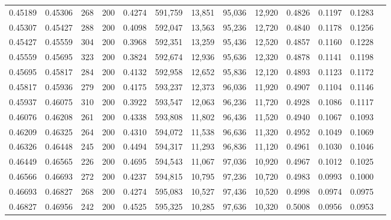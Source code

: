 \begin{tabular}{rrrrrrrrrrrrr}
0.45189 & 0.45306 &   268 & 200 &                                     0.4274 & 591,759 &  13,851 &  95,036 &  12,920 & 0.4826 & 0.1197 & 0.1283 \\
0.45307 & 0.45427 &   288 & 200 &                                     0.4098 & 592,047 &  13,563 &  95,236 &  12,720 & 0.4840 & 0.1178 & 0.1256 \\
0.45427 & 0.45559 &   304 & 200 &                                     0.3968 & 592,351 &  13,259 &  95,436 &  12,520 & 0.4857 & 0.1160 & 0.1228 \\
0.45559 & 0.45695 &   323 & 200 &                                     0.3824 & 592,674 &  12,936 &  95,636 &  12,320 & 0.4878 & 0.1141 & 0.1198 \\
0.45695 & 0.45817 &   284 & 200 &                                     0.4132 & 592,958 &  12,652 &  95,836 &  12,120 & 0.4893 & 0.1123 & 0.1172 \\
0.45817 & 0.45936 &   279 & 200 &                                     0.4175 & 593,237 &  12,373 &  96,036 &  11,920 & 0.4907 & 0.1104 & 0.1146 \\
0.45937 & 0.46075 &   310 & 200 &                                     0.3922 & 593,547 &  12,063 &  96,236 &  11,720 & 0.4928 & 0.1086 & 0.1117 \\
0.46076 & 0.46208 &   261 & 200 &                                     0.4338 & 593,808 &  11,802 &  96,436 &  11,520 & 0.4940 & 0.1067 & 0.1093 \\
0.46209 & 0.46325 &   264 & 200 &                                     0.4310 & 594,072 &  11,538 &  96,636 &  11,320 & 0.4952 & 0.1049 & 0.1069 \\
0.46326 & 0.46448 &   245 & 200 &                                     0.4494 & 594,317 &  11,293 &  96,836 &  11,120 & 0.4961 & 0.1030 & 0.1046 \\
0.46449 & 0.46565 &   226 & 200 &                                     0.4695 & 594,543 &  11,067 &  97,036 &  10,920 & 0.4967 & 0.1012 & 0.1025 \\
0.46566 & 0.46693 &   272 & 200 &                                     0.4237 & 594,815 &  10,795 &  97,236 &  10,720 & 0.4983 & 0.0993 & 0.1000 \\
0.46693 & 0.46827 &   268 & 200 &                                     0.4274 & 595,083 &  10,527 &  97,436 &  10,520 & 0.4998 & 0.0974 & 0.0975 \\
0.46827 & 0.46956 &   242 & 200 &                                     0.4525 & 595,325 &  10,285 &  97,636 &  10,320 & 0.5008 & 0.0956 & 0.0953 \\

\end{tabular}

